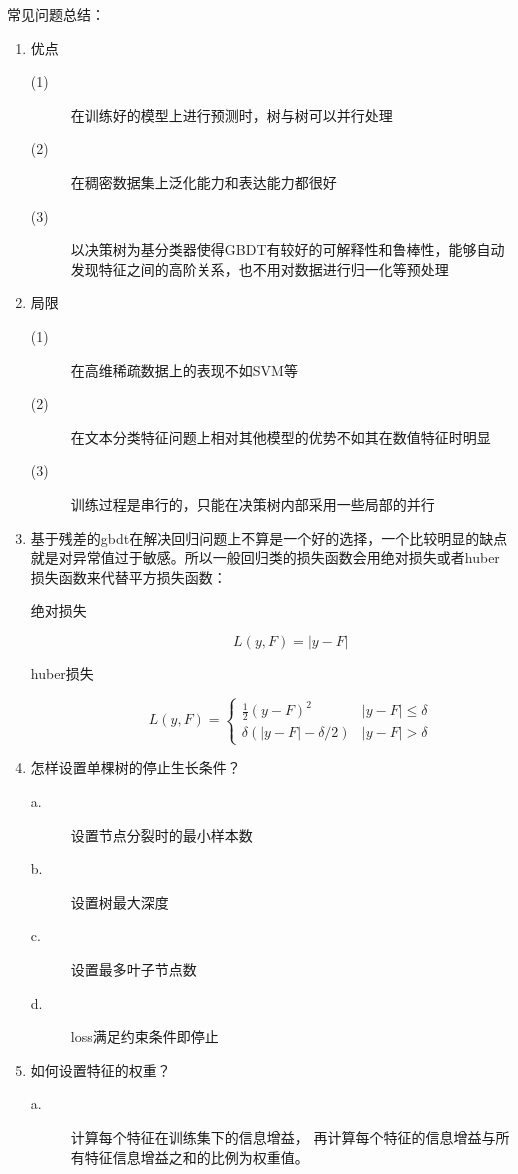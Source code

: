 \documentclass[UTF8]{article}%
\begin{document}
			常见问题总结：
			\begin{enumerate}
				\item 优点
				\begin{description}
					\item[(1)] 在训练好的模型上进行预测时，树与树可以并行处理
					\item[(2)] 在稠密数据集上泛化能力和表达能力都很好
					\item[(3)] 以决策树为基分类器使得GBDT有较好的可解释性和鲁棒性，能够自动发现特征之间的高阶关系，也不用对数据进行归一化等预处理
				\end{description}
				\item 局限
				\begin{description}
					\item[(1)] 在高维稀疏数据上的表现不如SVM等
					\item[(2)] 在文本分类特征问题上相对其他模型的优势不如其在数值特征时明显
					\item[(3)] 训练过程是串行的，只能在决策树内部采用一些局部的并行
				\end{description}
				\item 基于残差的gbdt在解决回归问题上不算是一个好的选择，一个比较明显的缺点就是对异常值过于敏感。所以一般回归类的损失函数会用绝对损失或者huber损失函数来代替平方损失函数：	
				\begin{description}
					\item[绝对损失]
					$$
					L(y, F)=|y-F|
					$$
					\item[huber损失] 
					$$
					L(y, F)=\left\{\begin{array}{ll}{\frac{1}{2}(y-F)^{2}} & {|y-F| \leq \delta} \\ {\delta(|y-F|-\delta / 2)} & {|y-F|>\delta}\end{array}\right.
					$$
				\end{description}
				\item 怎样设置单棵树的停止生长条件？
					\begin{description}
						\item[a.] 设置节点分裂时的最小样本数
						\item[b.] 设置树最大深度
						\item[c.] 设置最多叶子节点数
						\item[d.] loss满足约束条件即停止
					\end{description}
				\item 如何设置特征的权重？
				\begin{description}
					\item[a.] 计算每个特征在训练集下的信息增益，	再计算每个特征的信息增益与所有特征信息增益之和的比例为权重值。

\end{description}
\end{enumerate}
\end{document}
